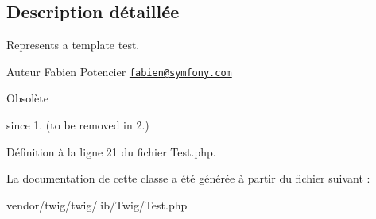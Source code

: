 \subsection{Description détaillée}
Represents a template test.

\begin{DoxyAuthor}{Auteur}
Fabien Potencier \href{mailto:fabien@symfony.com}{\tt fabien@symfony.\+com}
\end{DoxyAuthor}
\begin{DoxyRefDesc}{Obsolète}
\item[\hyperlink{deprecated__deprecated000040}{Obsolète}]since 1. (to be removed in 2.) \end{DoxyRefDesc}


Définition à la ligne 21 du fichier Test.\+php.



La documentation de cette classe a été générée à partir du fichier suivant \+:\begin{DoxyCompactItemize}
\item 
vendor/twig/twig/lib/\+Twig/Test.\+php\end{DoxyCompactItemize}
